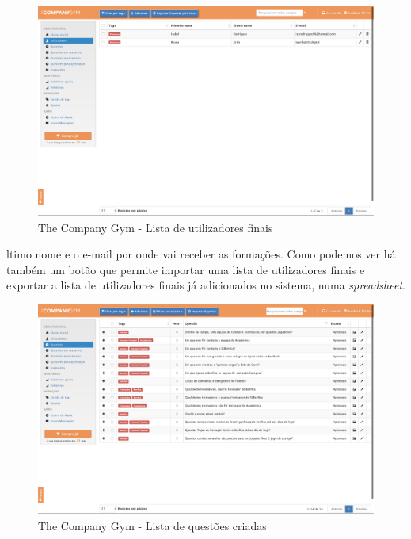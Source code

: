 \begin{figure}[ht!]
	\begin{center}
		\includegraphics[width=1\textwidth]{img/tcg/tcg-utilizadores.png}
		\caption{The Company Gym - Lista de utilizadores finais}
		\label{fig:tcg-utilizadores}
	\end{center}
\end{figure}

ltimo nome e o e-mail por onde vai receber as formações. Como podemos ver há também um botão que permite importar uma lista de utilizadores finais e exportar a lista de utilizadores finais já adicionados no sistema, numa \textit{spreadsheet}.
\newpage

\begin{figure}[ht!]
	\begin{center}
		\includegraphics[width=1\textwidth]{img/tcg/tcg-questoes.png}
		\caption{The Company Gym - Lista de questões criadas}
		\label{fig:tcg-questoes}
	\end{center}
\end{figure}

